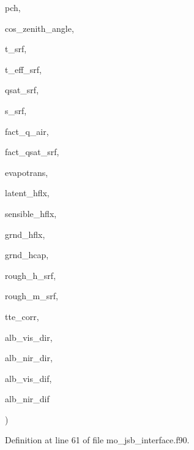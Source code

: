 {\begin{DoxyParamCaption}
\item[{real(wp), dimension              (\+:), intent(in)}]{pch, }
\item[{real(wp), dimension (\+:), intent(in)}]{cos\+\_\+zenith\+\_\+angle, }
\item[{real(wp), dimension            (\+:), intent(out)}]{t\+\_\+srf, }
\item[{real(wp), dimension        (\+:), intent(out)}]{t\+\_\+eff\+\_\+srf, }
\item[{real(wp), dimension         (\+:), intent(out)}]{qsat\+\_\+srf, }
\item[{real(wp), dimension            (\+:), intent(out)}]{s\+\_\+srf, }
\item[{real(wp), dimension       (\+:), intent(out)}]{fact\+\_\+q\+\_\+air, }
\item[{real(wp), dimension    (\+:), intent(out)}]{fact\+\_\+qsat\+\_\+srf, }
\item[{real(wp), dimension       (\+:), intent(out)}]{evapotrans, }
\item[{real(wp), dimension      (\+:), intent(out)}]{latent\+\_\+hflx, }
\item[{real(wp), dimension    (\+:), intent(out)}]{sensible\+\_\+hflx, }
\item[{real(wp), dimension        (\+:), intent(out)}]{grnd\+\_\+hflx, }
\item[{real(wp), dimension        (\+:), intent(out)}]{grnd\+\_\+hcap, }
\item[{real(wp), dimension      (\+:), intent(out)}]{rough\+\_\+h\+\_\+srf, }
\item[{real(wp), dimension      (\+:), intent(out)}]{rough\+\_\+m\+\_\+srf, }
\item[{real(wp), dimension         (\+:), intent(out)}]{tte\+\_\+corr, }
\item[{real(wp), dimension      (\+:), intent(out)}]{alb\+\_\+vis\+\_\+dir, }
\item[{real(wp), dimension      (\+:), intent(out)}]{alb\+\_\+nir\+\_\+dir, }
\item[{real(wp), dimension      (\+:), intent(out)}]{alb\+\_\+vis\+\_\+dif, }
\item[{real(wp), dimension      (\+:), intent(out)}]{alb\+\_\+nir\+\_\+dif}
\end{DoxyParamCaption}
)}\label{namespacemo__jsb__interface_a669b978bf786a78426b4aa57d8c8f7b1}


Definition at line 61 of file mo\+\_\+jsb\+\_\+interface.\+f90.



